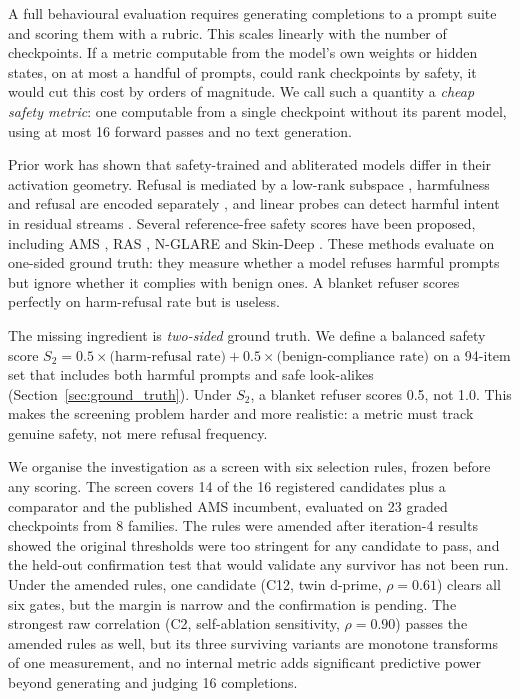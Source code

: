 \documentclass[11pt,letterpaper]{article}
\begin{document}
A full behavioural evaluation requires generating completions to a prompt
suite and scoring them with a rubric. This scales linearly with the number
of checkpoints. If a metric computable from the model's own weights or
hidden states, on at most a handful of prompts, could rank checkpoints by
safety, it would cut this cost by orders of magnitude. We call such a
quantity a \emph{cheap safety metric}: one computable from a single
checkpoint without its parent model, using at most 16 forward passes and
no text generation.

Prior work has shown that safety-trained and abliterated models differ in
their activation geometry. Refusal is mediated by a low-rank subspace
\citep{Arditi2024}, harmfulness and refusal are encoded separately
\citep{Zhao2025}, and linear probes can detect harmful intent in residual
streams \citep{LlorenteSaguer2026a, LlorenteSaguer2026b}. Several
reference-free safety scores have been proposed, including AMS
\citep{Messenger2026}, RAS \citep{Huang2026}, N-GLARE
\citep{Lin2025} and Skin-Deep \citep{Lee2026}. These methods evaluate
on one-sided ground truth: they measure whether a model refuses harmful
prompts but ignore whether it complies with benign ones. A blanket refuser
scores perfectly on harm-refusal rate but is useless.

The missing ingredient is \emph{two-sided} ground truth. We define a
balanced safety score
$S_2 = 0.5 \times \text{(harm-refusal rate)} + 0.5 \times
\text{(benign-compliance rate)}$
on a 94-item set that includes both harmful prompts and safe look-alikes
(Section~\ref{sec:ground_truth}). Under $S_2$, a blanket refuser scores
0.5, not 1.0. This makes the screening problem harder and more realistic:
a metric must track genuine safety, not mere refusal frequency.

We organise the investigation as a screen with six selection rules, frozen
before any scoring. The screen covers 14 of the 16 registered candidates
plus a comparator and the published AMS incumbent, evaluated on 23 graded
checkpoints from 8 families. The rules were amended after iteration-4
results showed the original thresholds were too stringent for any
candidate to pass, and the held-out confirmation test that would validate
any survivor has not been run. Under the amended rules, one candidate
(C12, twin d-prime, $\rho = 0.61$) clears all six gates, but the margin
is narrow and the confirmation is pending. The strongest raw correlation
(C2, self-ablation sensitivity, $\rho = 0.90$) passes the amended rules
as well, but its three surviving variants are monotone transforms of one
measurement, and no internal metric adds significant predictive power
beyond generating and judging 16 completions.
\end{document}
